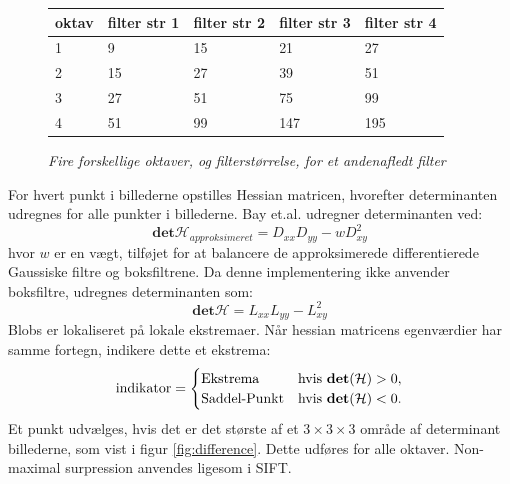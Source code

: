 \begin{figure}[H]
    \centering
    \begin{center}    
    \begin{tabular}{ | l | l | l | l | l |}
    \hline
    oktav & filter str 1 & filter str 2 & filter str 3 & filter str 4 \\ \hline
    1 & 9 & 15 & 21 & 27 \\ \hline
  	2 & 15 & 27 & 39 & 51 \\ \hline
  	3 & 27 & 51 & 75 & 99 \\ \hline
  	4 & 51 & 99 & 147 & 195 \\ \hline
    \end{tabular}       
    \caption{{\footnotesize \textit{Fire forskellige oktaver, og filterstørrelse, for et andenafledt filter}}}
    \label{fig:secderivfiltersize}
     \end{center}
     \vspace{-2.5em}
  \end{figure} \noindent
For hvert punkt i billederne opstilles Hessian matricen, hvorefter determinanten udregnes for alle punkter i billederne. Bay et.al. udregner determinanten ved:
\begin{equation}
\textbf{det}\mathcal{H}_{approksimeret} = D_{xx}D_{yy}-wD_{xy}^2
\label{deerminantofhessian}
\end{equation}
hvor $w$ er en vægt, tilføjet for at balancere de approksimerede differentierede Gaussiske filtre og boksfiltrene. Da denne implementering ikke anvender boksfiltre, udregnes determinanten som:
\begin{equation}
\textbf{det}\mathcal{H} = L_{xx}L_{yy}-L_{xy}^2
\label{deerminantofhessian}
\end{equation}
Blobs er lokaliseret på lokale ekstremaer. Når hessian matricens egenværdier har samme fortegn, indikere dette et ekstrema:
\begin{equation}
\begin{split}
\text{indikator} = 
\begin{cases}
\text{Ekstrema}& \text{hvis } \bold{det}(\mathcal{H}) > 0,  \\
\text{Saddel-Punkt} & \text{hvis } \bold{det}(\mathcal{H}) < 0.
\end{cases}
\end{split}
\label{detman}
\end{equation}
Et punkt udvælges, hvis det er det største af et $3\times3\times3$ område af determinant billederne, som vist i figur \ref{fig:difference}. Dette udføres for alle oktaver. Non-maximal surpression anvendes ligesom i SIFT.
